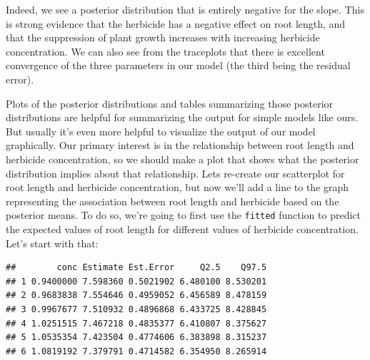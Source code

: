 \documentclass[
]{book}
\newenvironment{Shaded}{\begin{snugshade}}{\end{snugshade}}
\newcommand{\AttributeTok}[1]{\textcolor[rgb]{0.13,0.29,0.53}{#1}}
\newcommand{\CommentTok}[1]{\textcolor[rgb]{0.56,0.35,0.01}{\textit{#1}}}
\newcommand{\DecValTok}[1]{\textcolor[rgb]{0.00,0.00,0.81}{#1}}
\newcommand{\FunctionTok}[1]{\textcolor[rgb]{0.13,0.29,0.53}{\textbf{#1}}}
\newcommand{\NormalTok}[1]{#1}
\newcommand{\OtherTok}[1]{\textcolor[rgb]{0.56,0.35,0.01}{#1}}
\newcommand{\SpecialCharTok}[1]{\textcolor[rgb]{0.81,0.36,0.00}{\textbf{#1}}}
\begin{document}
Indeed, we see a posterior distribution that is entirely negative for the slope. This is strong evidence that the herbicide has a negative effect on root length, and that the suppression of plant growth increases with increasing herbicide concentration. We can also see from the traceplots that there is excellent convergence of the three parameters in our model (the third being the residual error).

Plots of the posterior distributions and tables summarizing those posterior distributions are helpful for summarizing the output for simple models like ours. But usually it's even more helpful to visualize the output of our model graphically. Our primary interest is in the relationship between root length and herbicide concentration, so we should make a plot that shows what the posterior distribution implies about that relationship. Lets re-create our scatterplot for root length and herbicide concentration, but now we'll add a line to the graph representing the association between root length and herbicide based on the posterior means. To do so, we're going to first use the \texttt{fitted} function to predict the expected values of root length for different values of herbicide concentration. Let's start with that:

\begin{Shaded}
\end{Shaded}

\begin{verbatim}
##        conc Estimate Est.Error     Q2.5    Q97.5
## 1 0.9400000 7.598360 0.5021902 6.480100 8.530201
## 2 0.9683838 7.554646 0.4959052 6.456589 8.478159
## 3 0.9967677 7.510932 0.4896868 6.433725 8.428845
## 4 1.0251515 7.467218 0.4835377 6.410807 8.375627
## 5 1.0535354 7.423504 0.4774606 6.383898 8.315237
## 6 1.0819192 7.379791 0.4714582 6.354950 8.265914
\end{verbatim}
\end{document}
